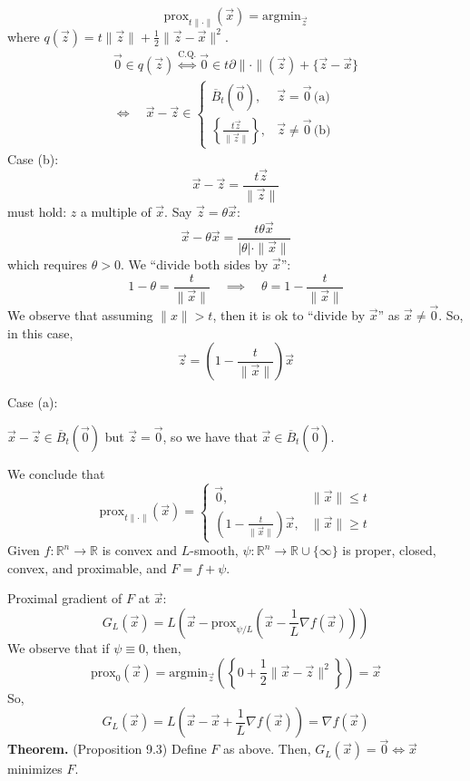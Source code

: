 \documentclass{article}
\newcommand{\R}{\mathbb{R}}             %
\newcommand{\x}{\vec{x}}                %
\newcommand{\z}{\vec{z}}                %
\begin{document}
\[
    \text{prox}_{t \|\cdot\|}(\x) = \text{argmin}_{\z}
\]
where $q(\z) = t\|\z\| + \frac{1}{2}\|\z - \x\|^2$.
\begin{align*}
    \vec{0} \in q(\z) \overset{\text{C.Q.}}{\iff} \vec{0} \in t\partial \|\cdot\|(\z) + \{\z - \x\} \\
    \iff \quad \x - \z \in \begin{cases}
        \overline{B}_t\left(\vec{0}\right), & \z = \vec{0}\, \text{(a)} \\
        \left\{\frac{t\z}{\|\z\|}\right\}, & \z \neq \vec{0}\, \text{(b)}
    \end{cases}
\end{align*}
Case (b):
\[
    \x - \z = \frac{t\z}{\|\z\|}
\]
must hold: $z$ a multiple of $\x$. Say $\z = \theta\x$:
\[
    \x - \theta\x = \frac{t\theta\x}{|\theta| \cdot \|\x\|}
\]
which requires $\theta > 0$. We ``divide both sides by $\x$'':
\[
    1 - \theta = \frac{t}{\|\x\|} \quad \implies \quad \theta = 1 - \frac{t}{\|\x\|}
\]
We observe that assuming $\|x\| > t$, then it is ok to ``divide by $\x$'' as $\x \neq \vec{0}$. So, in this case,
\[
    \z = \left(1 - \frac{t}{\|\x\|}\right)\x
\]

Case (a):

$\x - \z \in \overline{B}_t\left(\vec{0}\right)$ but $\z = \vec{0}$, so we have that $\x \in \overline{B}_t\left(\vec{0}\right)$.

We conclude that
\[
    \text{prox}_{t \|\cdot\|}(\x) = \begin{cases}
        \vec{0}, & \|\x\| \leq t \\
        \left(1 - \frac{t}{\|\x\|}\right)\x, & \|\x\| \geq t
    \end{cases}
\]
Given $f \colon \R^n \to \R$ is convex and $L$-smooth, $\psi \colon \R^n \to \R \cup \{\infty\}$ is proper, closed, convex, and proximable, and $F = f + \psi$.

Proximal gradient of $F$ at $\x$:
\[
    G_L(\x) = L\left(\x - \text{prox}_{\psi/L}\left(\x - \frac{1}{L}\nabla f(\x)\right)\right)
\]
We observe that if $\psi \equiv 0$, then,
\[
    \text{prox}_0(\x) = \text{argmin}_{\z}\left(\left\{0 + \frac{1}{2}\|\x - \z\|^2\right\}\right) = \x
\]
So,
\[
    G_L(\x) = L\left(\x - \x + \frac{1}{L}\nabla f(\x)\right) = \nabla f(\x)
\]
\textbf{Theorem.} (Proposition 9.3)
Define $F$ as above. Then, $G_L(\x) = \vec{0} \iff \x$ minimizes $F$.
\end{document}
